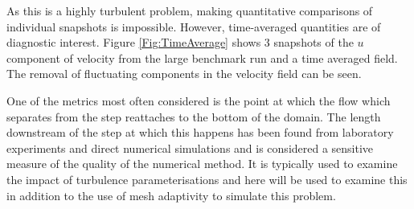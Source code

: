 

As this is a highly turbulent problem, making quantitative comparisons of
individual snapshots is impossible. However, time-averaged quantities are of diagnostic interest.
Figure \ref{Fig:TimeAverage} shows 3 snapshots of the $u$ component of velocity from the large
benchmark run and a time
averaged field. The removal of fluctuating components in the velocity field can be seen.




One of the metrics most often considered is the point at which the flow which separates from the step
reattaches to the bottom of the domain. The length downstream of the step at which this happens
has been found from laboratory experiments and direct numerical simulations and is considered a
sensitive measure of the quality of the numerical method. It is typically used to examine the impact
of turbulence parameterisations and here will be used to examine this in addition to the use of mesh
adaptivity to simulate this problem.

